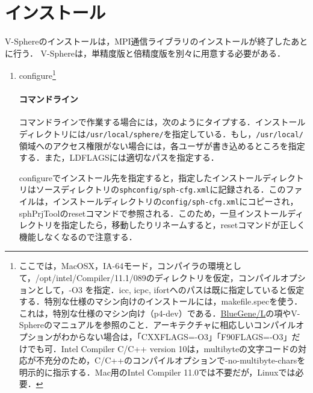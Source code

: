 
%
\section{インストール}
\label{sec:install}
V-Sphereのインストールは，MPI通信ライブラリのインストールが終了したあとに行う．
V-Sphereは，単精度版と倍精度版を別々に用意する必要がある．

\begin{enumerate}

\item configure\footnote{ここでは，MacOSX，IA-64モード，コンパイラの環境として，/opt/intel/Compiler/11.1/089のディレクトリを仮定，コンパイルオプションとして，-O3 を指定．icc, icpc, ifortへのパスは既に指定していると仮定する．特別な仕様のマシン向けのインストールには，makefile.specを使う．これは，特別な仕様のマシン向け（p4-dev）である．\hyperlink{tgt:BGL}{BlueGene/L}の項やV-Sphereのマニュアルを参照のこと．アーキテクチャに相応しいコンパイルオプションがわからない場合は，「CXXFLAGS=-O3」「F90FLAGS=-O3」だけでも可．Intel Compiler C/C++ version 10は，multibyteの文字コードの対応が不充分のため，C/C++のコンパイルオプションで-no-multibyte-charsを明示的に指示する．Mac用のIntel Compiler 11.0では不要だが，Linuxでは必要．
}

\paragraph{コマンドライン}
コマンドラインで作業する場合には，次のようにタイプする．インストールディレクトリには\verb|/usr/local/sphere/|を指定している．もし，\verb|/usr/local/|領域へのアクセス権限がない場合には，各ユーザが書き込めるところを指定する．また，LDFLAGSには適切なパスを指定する．

{\small
{}
}

configureでインストール先を指定すると，指定したインストールディレクトリはソースディレクトリの\verb|sphconfig/sph-cfg.xml|に記録される．このファイルは，インストールディレクトリの\verb|config/sph-cfg.xml|にコピーされ，sphPrjToolのresetコマンドで参照される．このため，一旦インストールディレクトリを指定したら，移動したりリネームすると，resetコマンドが正しく機能しなくなるので注意する．


\end{enumerate}
